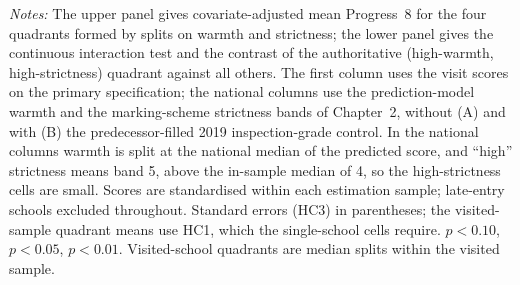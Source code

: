 \begin{table}[htbp]
\begin{minipage}{\linewidth}
\footnotesize\textit{Notes:} The upper panel gives covariate-adjusted mean Progress~8 for the four quadrants formed by splits on warmth and strictness; the lower panel gives the continuous interaction test and the contrast of the authoritative (high-warmth, high-strictness) quadrant against all others. The first column uses the visit scores on the primary specification; the national columns use the prediction-model warmth and the marking-scheme strictness bands of Chapter~2, without (A) and with (B) the predecessor-filled 2019 inspection-grade control. In the national columns warmth is split at the national median of the predicted score, and ``high'' strictness means band 5, above the in-sample median of 4, so the high-strictness cells are small. Scores are standardised within each estimation sample; late-entry schools excluded throughout. Standard errors (HC3) in parentheses; the visited-sample quadrant means use HC1, which the single-school cells require.
\sym{*} \(p<0.10\), \sym{**} \(p<0.05\), \sym{***} \(p<0.01\).
Visited-school quadrants are median splits within the visited sample. 
\end{minipage}
\end{table}
